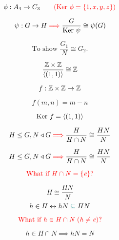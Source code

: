 \begin{frame}
  \[
	\phi: A_4 \to C_3 \qquad \textcolor{red}{(\text{Ker } \phi = \left\{1, x, y, z\right\})}
  \]
\end{frame}

\begin{frame}
  \begin{theorem}
	\[
	  \psi: G \to H \textcolor{red}{\implies} \frac{G}{\text{Ker } \psi} \cong \psi(G)
	\]
  \end{theorem}

  \pause
  \[
	\text{To show } \frac{G_1}{N} \cong G_2.
  \]
\end{frame}

\begin{frame}
  \[
	\frac{\mathbb{Z} \times \mathbb{Z}}{\langle (1, 1) \rangle} \cong \mathbb{Z}
  \]

  \pause
  \[
	f: \mathbb{Z} \times \mathbb{Z} \to \mathbb{Z}
  \]

  \pause
  \[
	f(m, n) = m - n
  \]

  \pause
  \[
	\text{Ker } f = \langle (1, 1) \rangle
  \]
\end{frame}

\begin{frame}
  \begin{theorem}
	\[
	  H \le G, N \triangleleft G \textcolor{red}{\implies} \frac{H}{H \cap N} \cong \frac{HN}{N} 
	\]
  \end{theorem}

  \pause
\end{frame}

\begin{frame}
  \begin{theorem}
	\[
	  H \le G, N \triangleleft G \textcolor{red}{\implies} \frac{H}{H \cap N} \cong \frac{HN}{N} 
	\]
  \end{theorem}

  \pause
  \[
	\textcolor{red}{\it \text{What if } H \cap N = \left\{e\right\}?}
  \]

  \pause
  \[
	H \cong \frac{HN}{N}
  \]
  \pause
  \[
	h \in H \leftrightarrow hN \;\textcolor{teal}{\subseteq}\; HN 
  \]

  \pause
  \[
	\textcolor{red}{\it \text{What if } h \in H \cap N\; (h \neq e)?}
  \]
  
  \pause
  \[
	h \in H \cap N \implies hN = N
  \]
\end{frame}

